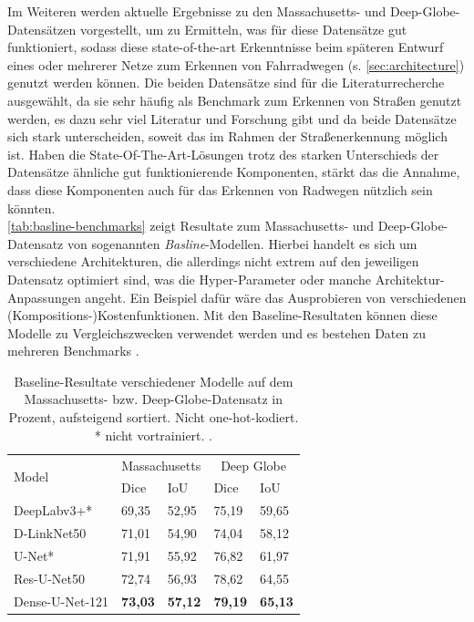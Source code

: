 Im Weiteren werden aktuelle Ergebnisse zu den Massachusetts- und Deep-Globe-Datensätzen vorgestellt, 
um zu Ermitteln, was für diese Datensätze gut funktioniert, sodass diese state-of-the-art Erkenntnisse beim 
späteren Entwurf eines oder mehrerer Netze zum Erkennen von Fahrradwegen (s. \autoref{sec:architecture}) 
genutzt werden können. Die beiden Datensätze sind für die Literaturrecherche ausgewählt, 
da sie sehr häufig als Benchmark zum Erkennen von Straßen genutzt werden, es dazu sehr viel Literatur und 
Forschung gibt und da beide Datensätze sich stark unterscheiden, soweit das im Rahmen der Straßenerkennung möglich ist. 
Haben die State-Of-The-Art-Lösungen trotz des starken Unterschieds der Datensätze ähnliche gut funktionierende
Komponenten, stärkt das die Annahme, dass diese Komponenten auch für das Erkennen von Radwegen nützlich sein könnten. \\   
\autoref{tab:basline-benchmarks} zeigt Resultate zum Massachusetts- und Deep-Globe-Datensatz von sogenannten \textit{Basline}-Modellen.
Hierbei handelt es sich um verschiedene Architekturen, die allerdings nicht extrem auf den jeweiligen Datensatz optimiert sind,
was die Hyper-Parameter oder manche Architektur-Anpassungen angeht. Ein Beispiel dafür wäre das Ausprobieren von verschiedenen (Kompositions-)Kostenfunktionen. 
Mit den Baseline-Resultaten können diese Modelle zu Vergleichszwecken verwendet werden 
und es bestehen Daten zu mehreren Benchmarks \cite{C.Henry.2021}.

\begin{table}
	\centering
	\begin{tabular}{l|l|l|l|l}
		\multirow{2}{*}{Model} & \multicolumn{2}{c|}{Massachusetts} & \multicolumn{2}{c}{Deep Globe}  \\
		& Dice & IoU & Dice & IoU \\
		\midrule
		DeepLabv3+* & 69,35 & 52,95 & 75,19 & 59,65 \\
		D-LinkNet50 & 71,01 & 54,90 & 74,04 & 58,12 \\
		U-Net* & 71,91 & 55,92 & 76,82 & 61,97 \\
		Res-U-Net50 & 72,74 & 56,93 & 78,62 & 64,55  \\
		Dense-U-Net-121 & \textbf{73,03} & \textbf{57,12} & \textbf{79,19} & \textbf{65,13}  \\
	\end{tabular}
	\caption{Baseline-Resultate verschiedener Modelle auf dem Massachusetts- 
	bzw. Deep-Globe-Datensatz in Prozent, aufsteigend sortiert. Nicht one-hot-kodiert. * nicht vortrainiert. \cite{C.Henry.2021}.}
	\label{tab:basline-benchmarks}
\end{table}

